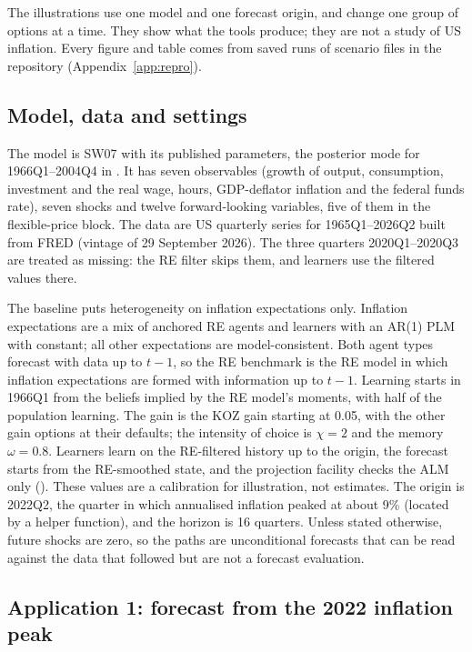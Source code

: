 \documentclass[pdflatex,sn-basic]{sn-jnl}
\DeclareRobustCommand{\code}[1]{\texttt{\detokenize{#1}}}
\begin{document}
The illustrations use one model and one forecast origin, and change one group of options at a
time. They show what the tools produce; they are not a study of US inflation. Every figure and
table comes from saved runs of scenario files in the repository (Appendix~\ref{app:repro}).

\subsection{Model, data and settings}\label{sec:sw07setup}

The model is SW07 with its published parameters, the posterior mode for 1966Q1--2004Q4 in
\citet{smets2007}. It has seven observables (growth of output, consumption, investment and the
real wage, hours, GDP-deflator inflation and the federal funds rate), seven shocks and twelve
forward-looking variables, five of them in the flexible-price block. The data are US quarterly
series for 1965Q1--2026Q2 built from FRED (vintage of 29 September 2026). The three quarters
2020Q1--2020Q3 are treated as missing: the RE filter skips them, and learners use the filtered
values there.

The baseline puts heterogeneity on inflation expectations only. Inflation expectations are a mix
of anchored RE agents and learners with an AR(1) PLM with constant; all other expectations are
model-consistent. Both agent types forecast with data up to $t-1$, so the RE benchmark is the RE
model in which inflation expectations are formed with information up to $t-1$. Learning starts in
1966Q1 from the beliefs implied by the RE model's moments, with half of the population learning.
The gain is the KOZ gain starting at 0.05, with the other gain options at their defaults; the
intensity of choice is $\chi = 2$ and the memory $\omega = 0.8$. Learners learn on the RE-filtered
history up to the origin, the forecast starts from the RE-smoothed state, and the projection
facility checks the ALM only (\code{'alm'}). These values are a calibration for illustration,
not estimates. The origin is 2022Q2, the quarter in which annualised inflation peaked at about
9\% (located by a helper function), and the horizon is 16 quarters. Unless stated otherwise,
future shocks are zero, so the paths are unconditional forecasts that can be read against the
data that followed but are not a forecast evaluation.

\subsection{Application 1: forecast from the 2022 inflation peak}\label{sec:app1}
\end{document}
